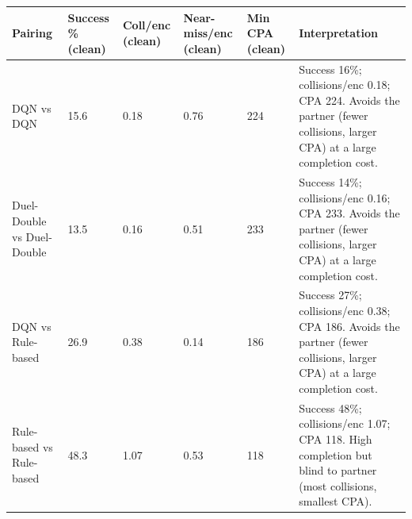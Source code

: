 \begin{tabular}{llllll}
\toprule
Pairing & Success \% (clean) & Coll/enc (clean) & Near-miss/enc (clean) & Min CPA (clean) & Interpretation \\
\midrule
DQN vs DQN & 15.6 & 0.18 & 0.76 & 224 & Success 16\%; collisions/enc 0.18; CPA 224. Avoids the partner (fewer collisions, larger CPA) at a large completion cost. \\
Duel-Double vs Duel-Double & 13.5 & 0.16 & 0.51 & 233 & Success 14\%; collisions/enc 0.16; CPA 233. Avoids the partner (fewer collisions, larger CPA) at a large completion cost. \\
DQN vs Rule-based & 26.9 & 0.38 & 0.14 & 186 & Success 27\%; collisions/enc 0.38; CPA 186. Avoids the partner (fewer collisions, larger CPA) at a large completion cost. \\
Rule-based vs Rule-based & 48.3 & 1.07 & 0.53 & 118 & Success 48\%; collisions/enc 1.07; CPA 118. High completion but blind to partner (most collisions, smallest CPA). \\
\bottomrule
\end{tabular}
